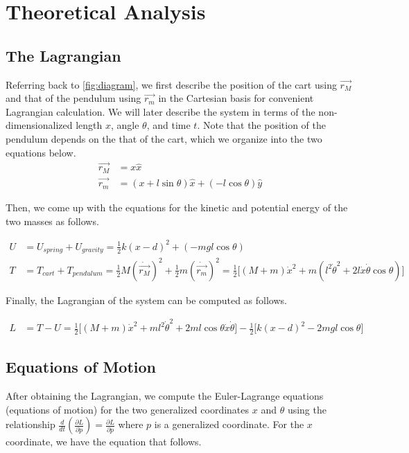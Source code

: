 \documentclass[12pt]{article}
\begin{document}
\section{Theoretical Analysis}
\subsection{The Lagrangian}

Referring back to \autoref{fig:diagram}, we first describe the position of the cart using $\Vec{r_M}$ and that of the pendulum using $\Vec{r_m}$ in the Cartesian basis for convenient Lagrangian calculation. We will later describe the system in terms of the non-dimensionalized length $x$, angle $\theta$, and time $t$. Note that the position of the pendulum depends on the that of the cart, which we organize into the two equations below.
\begin{align}
	\Vec{r_M} &= x \hat{x} \label{eq:r_M} \\
    \Vec{r_m} &= (x + l\sin{\theta}) \hat{x} + (-l\cos{\theta}) \hat{y} \label{eq:r_m}
\end{align}

Then, we come up with the equations for the kinetic and potential energy of the two masses as follows.

\begin{align}
	U &= U_{spring} + U_{gravity} = \frac{1}{2}k(x-d)^2 + (-mgl\cos{\theta})
      \label{eq:U} \\
    T &= T_{cart} + T_{pendulum} = \frac{1}{2}M(\dot{\Vec{r_M}})^2 + \frac{1}{2}m(\dot{\Vec{r_m}})^2 = \frac{1}{2} \big[ (M+m)\dot{x}^2 + m(l^2\dot{\theta}^2 + 2l\dot{x}\dot{\theta}\cos{\theta}) \big] \label{eq:T}
\end{align}

Finally, the Lagrangian of the system can be computed as follows.

\begin{align}
    L &= T - U = \frac{1}{2} \big[ (M+m)\dot{x}^2 + ml^2\dot{\theta}^2 + 2ml\cos{\theta}\dot{x}\dot{\theta}\big] - \frac{1}{2} \big[ k(x-d)^2 - 2mgl\cos{\theta} \big] \label{eq:L}
\end{align}

\subsection{Equations of Motion}

After obtaining the Lagrangian, we compute the Euler-Lagrange equations (equations of motion) for the two generalized coordinates $x$ and $\theta$ using the relationship $\frac{d}{dt} (\frac{\partial L}{\partial \dot{p}}) = \frac{\partial L}{\partial p}$ where $p$ is a generalized coordinate. For the $x$ coordinate, we have the equation that follows.
\end{document}
